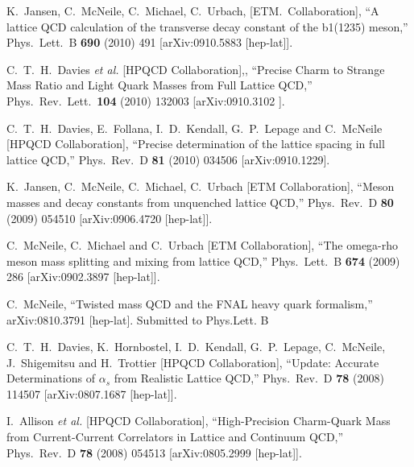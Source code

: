 \begin{thebibliography}{130}
  K.~Jansen, C.~McNeile, C.~Michael, C.~Urbach,
  [ETM.~Collaboration],
  ``A lattice QCD calculation of the transverse decay constant of the
  b1(1235)
  meson,''
  Phys.\ Lett.\  B {\bf 690} (2010) 491
  [arXiv:0910.5883 [hep-lat]].


  C.~T.~H.~Davies {\it et al.} [HPQCD Collaboration],,
``Precise Charm to Strange Mass Ratio and Light Quark Masses from
Full
Lattice QCD,''
  Phys.\ Rev.\ Lett.\  {\bf 104} (2010) 132003
  [arXiv:0910.3102 ].



  C.~T.~H.~Davies, E.~Follana, I.~D.~Kendall, G.~P.~Lepage and
  C.~McNeile
                  [HPQCD Collaboration],
  ``Precise determination of the lattice spacing in full lattice
  QCD,''
  Phys.\ Rev.\  D {\bf 81} (2010) 034506
  [arXiv:0910.1229].



  K.~Jansen, C.~McNeile, C.~Michael, C.~Urbach
 [ETM Collaboration],
  ``Meson masses and decay constants from unquenched lattice QCD,''
  Phys.\ Rev.\  D {\bf 80} (2009) 054510
  [arXiv:0906.4720 [hep-lat]].


  C.~McNeile, C.~Michael and C.~Urbach  [ETM Collaboration],
  ``The omega-rho meson mass splitting and mixing from lattice QCD,''
  Phys.\ Lett.\  B {\bf 674} (2009) 286
  [arXiv:0902.3897 [hep-lat]].

  C.~McNeile,
  ``Twisted mass QCD and the FNAL heavy quark formalism,''
  arXiv:0810.3791 [hep-lat]. Submitted to Phys.Lett. B


  C.~T.~H.~Davies, K.~Hornbostel, I.~D.~Kendall, G.~P.~Lepage,
  C.~McNeile, J.~Shigemitsu and H.~Trottier
                  [HPQCD Collaboration],
  ``Update: Accurate Determinations of $\alpha_s$ from Realistic
  Lattice QCD,''
  Phys.\ Rev.\  D {\bf 78} (2008) 114507
  [arXiv:0807.1687 [hep-lat]].


  I.~Allison {\it et al.}  [HPQCD Collaboration],
  ``High-Precision Charm-Quark Mass from Current-Current Correlators
  in Lattice
  and Continuum QCD,''
  Phys.\ Rev.\  D {\bf 78} (2008) 054513
  [arXiv:0805.2999 [hep-lat]].



\end{thebibliography}
